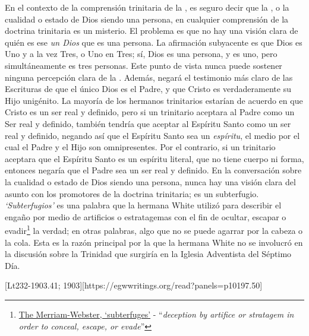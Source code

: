 En el contexto de la comprensión trinitaria de la , es seguro decir que la , o la cualidad o estado de Dios siendo una persona, en cualquier comprensión de la doctrina trinitaria es un misterio. El problema es que no hay una visión clara de quién es ese \textit{un Dios} que es una persona. La afirmación subyacente es que Dios es Uno y a la vez Tres, o Uno en Tres; sí, Dios es una persona, y es uno, pero simultáneamente es tres personas. Este punto de vista nunca puede sostener ninguna percepción clara de la . Además, negará el testimonio más claro de las Escrituras de que el único Dios es el Padre, y que Cristo es verdaderamente su Hijo unigénito. La mayoría de los hermanos trinitarios estarían de acuerdo en que Cristo es un ser real y definido, pero si un trinitario aceptara al Padre como un Ser real y definido, también tendría que aceptar al Espíritu Santo como un ser real y definido, negando así que el Espíritu Santo sea un \textit{espíritu}, el medio por el cual el Padre y el Hijo son omnipresentes. Por el contrario, si un trinitario aceptara que el Espíritu Santo es un espíritu literal, que no tiene cuerpo ni forma, entonces negaría que el Padre sea un ser real y definido. En la conversación sobre la cualidad o estado de Dios siendo una persona, nunca hay una visión clara del asunto con los promotores de la doctrina trinitaria; es un subterfugio. \textit{‘Subterfugios’} es una palabra que la hermana White utilizó para describir el engaño por medio de artificios o estratagemas con el fin de ocultar, escapar o evadir\footnote{\href{https://www.merriam-webster.com/dictionary/subterfuges}{The Merriam-Webster, ‘subterfuges’} - “\textit{deception by artifice or stratagem in order to conceal, escape, or evade}”} la verdad; en otras palabras, algo que no se puede agarrar por la cabeza o la cola. Esta es la razón principal por la que la hermana White no se involucró en la discusión sobre la Trinidad que surgiría en la Iglesia Adventista del Séptimo Día.


[Lt232-1903.41; 1903][https://egwwritings.org/read?panels=p10197.50]


